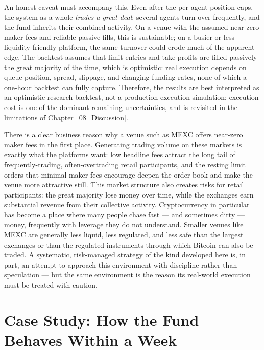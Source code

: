 An honest caveat must accompany this. Even after the per-agent position caps, the system as a whole \textit{trades a great deal}: several agents turn over frequently, and the fund inherits their combined activity. On a venue with the assumed near-zero maker fees and reliable passive fills, this is sustainable; on a busier or less liquidity-friendly platform, the same turnover could erode much of the apparent edge. The backtest assumes that limit entries and take-profits are filled passively the great majority of the time, which is optimistic: real execution depends on queue position, spread, slippage, and changing funding rates, none of which a one-hour backtest can fully capture. Therefore, the results are best interpreted as an optimistic research backtest, not a production execution simulation; execution cost is one of the dominant remaining uncertainties, and is revisited in the limitations of Chapter~\ref{08_Discussion}.


There is a clear business reason why a venue such as MEXC offers near-zero maker fees in the first place. Generating trading volume on these markets is exactly what the platforms want: low headline fees attract the long tail of frequently-trading, often-overtrading retail participants, and the resting limit orders that minimal maker fees encourage deepen the order book and make the venue more attractive still. This market structure also creates risks for retail participants: the great majority lose money over time, while the exchanges earn substantial revenue from their collective activity. Cryptocurrency in particular has become a place where many people chase fast --- and sometimes dirty --- money, frequently with leverage they do not understand. Smaller venues like MEXC are generally less liquid, less regulated, and less safe than the largest exchanges or than the regulated instruments through which Bitcoin can also be traded. A systematic, risk-managed strategy of the kind developed here is, in part, an attempt to approach this environment with discipline rather than speculation --- but the same environment is the reason its real-world execution must be treated with caution.

\section{Case Study: How the Fund Behaves Within a Week}
\label{sec:case_study}

